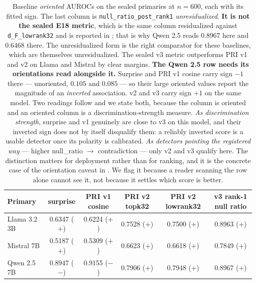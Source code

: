 \documentclass[10pt, letterpaper]{article}
\begin{document}
\begin{table}[htbp]
  \centering
  \small
  \begin{tabular}{lccccc}
  \toprule
  Primary & surprise & PRI v1 cosine & PRI v2 topk32 & PRI v2 lowrank32
    & v3 rank-1 null ratio \\
  \midrule
  Llama 3.2 3B  & 0.6347 ($+$) & 0.6224 ($+$) & 0.7528 ($+$)
    & 0.7500 ($+$) & 0.8963 ($+$) \\
  Mistral 7B    & 0.5187 ($+$) & 0.5309 ($+$) & 0.6623 ($+$)
    & 0.6618 ($+$) & 0.7849 ($+$) \\
  Qwen 2.5 7B   & 0.8947 ($\mathbf{-}$) & 0.9155 ($\mathbf{-}$)
    & 0.7906 ($+$) & 0.7948 ($+$) & 0.8967 ($+$) \\
  \bottomrule
  \end{tabular}
  \caption{Baseline \emph{oriented} AUROCs on the sealed primaries at
  $n=600$, each with its fitted sign. The last column is
  \texttt{null\_ratio\_post\_rank1} \emph{unresidualized}.
  \textbf{It is not the sealed E18 metric}, which is the same column
  residualized against \texttt{d\_F\_lowrank32} and is reported in
  ; that is why Qwen 2.5 reads $0.8967$ here and $0.6468$
  there. The unresidualized form is the right comparator for these
  baselines, which are themselves unresidualized. The sealed v3 metric
  outperforms PRI v1 and v2 on Llama and Mistral by clear margins.
  \textbf{The Qwen 2.5 row needs its orientations read alongside it.}
  Surprise and PRI v1 cosine carry sign $-1$ there --- unoriented,
  $0.105$ and $0.085$ --- so their large oriented values report the
  magnitude of an \emph{inverted} association. v2 and v3 carry sign
  $+1$ on the same model. Two readings follow and we state both,
  because the column is oriented and an oriented column is a
  discrimination-strength measure. \emph{As discrimination strength},
  surprise and v1 genuinely are close to v3 on this model, and their
  inverted sign does not by itself disqualify them: a reliably inverted
  score is a usable detector once its polarity is calibrated.
  \emph{As detectors pointing the registered way} --- higher
  null\_ratio $\to$ contradiction --- only v2 and v3 qualify here. The
  distinction matters for deployment rather than for ranking, and it is
  the concrete case of the orientation caveat in
  . We flag it because a reader scanning the
  row alone cannot see it, not because it settles which score is
  better.}
  \label{tab:baselines}
\end{table}
\end{document}
